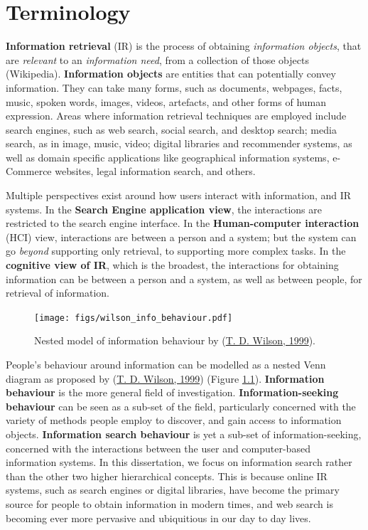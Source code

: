 \documentclass[a4paper, nobind]{templates/ociamthesis}
\begin{document}
\hypertarget{sec:bg_search_terminology}{%
\section{Terminology}\label{sec:bg_search_terminology}}

\textbf{Information retrieval} (IR) is the process of obtaining \emph{information
objects}, that are \emph{relevant} to an \emph{information need}, from a
collection of those objects (Wikipedia). \textbf{Information objects} are
entities that can potentially convey information. They can take many
forms, such as documents, webpages, facts, music, spoken words, images,
videos, artefacts, and other forms of human expression. Areas where
information retrieval techniques are employed include search engines,
such as web search, social search, and desktop search; media search, as
in image, music, video; digital libraries and recommender systems, as
well as domain specific applications like geographical information
systems, e-Commerce websites, legal information search, and others.

Multiple perspectives exist around how users interact with information,
and IR systems. In the \textbf{Search Engine application view}, the
interactions are restricted to the search engine interface. In the
\textbf{Human-computer interaction} (HCI) view, interactions are between a
person and a system; but the system can go \emph{beyond} supporting only
retrieval, to supporting more complex tasks. In the \textbf{cognitive view of
IR}, which is the broadest, the interactions for obtaining information
can be between a person and a system, as well as between people, for
retrieval of information.

\begin{figure}
\hypertarget{fig_wilson_info_behaviour}{%
\centering
\texttt{[image: figs/wilson\_info\_behaviour.pdf]}
\caption{Nested model of information behaviour by (\protect\hyperlink{ref-wilson1999models}{T. D. Wilson, 1999}).}\label{fig_wilson_info_behaviour}
}
\end{figure}

People's behaviour around information can be modelled as a nested Venn
diagram as proposed by (\protect\hyperlink{ref-wilson1999models}{T. D. Wilson, 1999}) (Figure
\protect\hyperlink{fig_wilson_info_behaviour}{1.1}). \textbf{Information behaviour} is
the more general field of investigation. \textbf{Information-seeking
behaviour} can be seen as a sub-set of the field, particularly
concerned with the variety of methods people employ to discover, and
gain access to information objects. \textbf{Information search behaviour} is
yet a sub-set of information-seeking, concerned with the interactions
between the user and computer-based information systems. In this
dissertation, we focus on information search rather than the other two
higher hierarchical concepts. This is because online IR systems, such as
search engines or digital libraries, have become the primary source for
people to obtain information in modern times, and web search is becoming
ever more pervasive and ubiquitious in our day to day lives.
\end{document}
